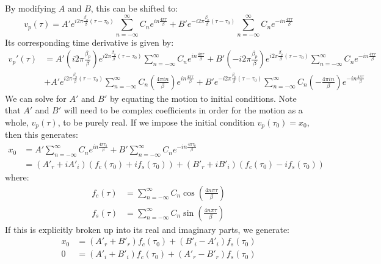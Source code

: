 \documentclass{article}
\begin{document}
By modifying $A$ and $B$, this can be shifted to:
\begin{equation}
	v_p (\tau) = A' e^{i 2 \pi \frac{\beta_p}{\beta} (\tau - \tau_0)} \sum_{n = - \infty}^{\infty} C_{n} e^{i n \frac{4 \pi \tau}{\beta}} + B' e^{- i 2 \pi \frac{\beta_p}{\beta} (\tau - \tau_0)} \sum_{n = - \infty}^{\infty} C_{n} e^{- i n \frac{4 \pi \tau}{\beta}}
	\label{eq:motion3}
\end{equation}
Its corresponding time derivative is given by:
\begin{align}
	v_p' (\tau) & = A' \left( i 2 \pi \frac{\beta_p}{\beta} \right) e^{i 2 \pi \frac{\beta_p}{\beta} (\tau - \tau_0)} \sum_{n = - \infty}^{\infty} C_{n} e^{i n \frac{4 \pi \tau}{\beta}} + B' \left( - i 2 \pi \frac{\beta_p}{\beta} \right) e^{i 2 \pi \frac{\beta_p}{\beta} (\tau - \tau_0)} \sum_{n = - \infty}^{\infty} C_{n} e^{- i n \frac{4 \pi \tau}{\beta}} \nonumber \\
	& + A' e^{i 2 \pi \frac{\beta_p}{\beta} (\tau - \tau_0)} \sum_{n = - \infty}^{\infty} C_{n} \left(\frac{4 \pi i n}{\beta} \right) e^{i n \frac{4 \pi \tau}{\beta}} + B' e^{- i 2 \pi \frac{\beta_p}{\beta} (\tau - \tau_0)} \sum_{n = - \infty}^{\infty} C_{n} \left(- \frac{4 \pi i n}{\beta} \right) e^{-i n \frac{4 \pi \tau}{\beta}} 
\end{align}
We can solve for $A'$ and $B'$ by equating the motion to initial conditions. Note that $A'$ and $B'$ will need to be complex coefficients in order for the motion as a whole, $v_p (\tau)$, to be purely real. If we impose the initial condition $v_p (\tau_0) = x_0$, then this generates:
\begin{align}
x_0 & = A' \sum_{n = - \infty}^{\infty} C_n e^{i n \frac{4 \pi \tau_0}{\beta}} + B' \sum_{n = -\infty}^{\infty} C_n e^{-i n \frac{4 \pi \tau_0}{\beta}} \\
& = (A'_r + i A'_i) (f_c (\tau_0) + i f_s (\tau_0)) + (B'_r + i B'_i) (f_c (\tau_0) - i f_s (\tau_0) )
\end{align}
where:
\begin{align}
f_c (\tau)	& = \sum_{n = - \infty}^{\infty} C_n \cos \left( \frac{4 n \pi \tau}{\beta} \right) \\
f_s (\tau) & = \sum_{n = - \infty}^{\infty} C_n \sin \left( \frac{4 n \pi \tau}{\beta} \right)
\end{align}
If this is explicitly broken up into its real and imaginary parts, we generate:
\begin{align}
	x_0 & = (A'_r + B'_r) f_c (\tau_0) + (B'_i - A'_i) f_s (\tau_0) \label{eq:cond1} \\
	0 & = (A'_i + B'_i) f_c (\tau_0) + (A'_r - B'_r) f_s (\tau_0) \label{eq:cond2}
\end{align}
\end{document}
